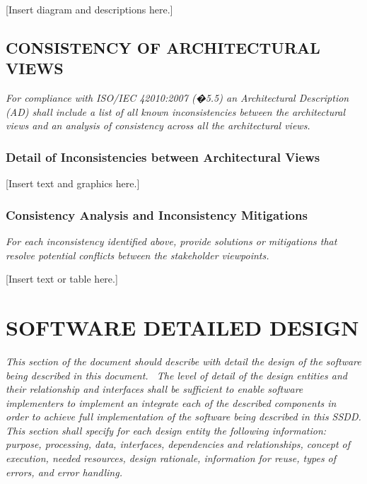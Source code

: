 \documentclass[twoside,letterpaper]{article}
\begin{document}
{\color{black}
[Insert diagram and descriptions here.]}

\subsection[CONSISTENCY OF ARCHITECTURAL
VIEWS]{\bfseries\color{black} CONSISTENCY OF
ARCHITECTURAL VIEWS}
{\itshape\color{black}
For compliance with ISO/IEC 42010:2007 (�5.5) an Architectural
Description (AD) shall include a list of all known inconsistencies
between the architectural views and an analysis of consistency across
all the architectural views.}

\subsubsection{Detail of Inconsistencies between Architectural Views}
{\color{black}
[Insert text and graphics here.]}

\subsubsection{Consistency Analysis and Inconsistency Mitigations}
{\itshape\color{black}
For each inconsistency identified above, provide solutions or
mitigations that resolve potential conflicts between the stakeholder
viewpoints.}

{\color{black}
[Insert text or table here.]}

\section{SOFTWARE DETAILED DESIGN}
{\itshape\color{black}
This section of the document should describe with detail the design of
the software being described in this document. \ The level of detail of
the design entities and their relationship and interfaces shall be
sufficient to enable software implementers to implement an integrate
each of the described components in order to achieve full
implementation of the software being described in this SSDD. This
section shall specify for each design entity the following information:
purpose, processing, data, interfaces, dependencies and relationships,
concept of execution, needed resources, design rationale, information
for reuse, types of errors, and error handling. \ }


\bigskip
\end{document}
